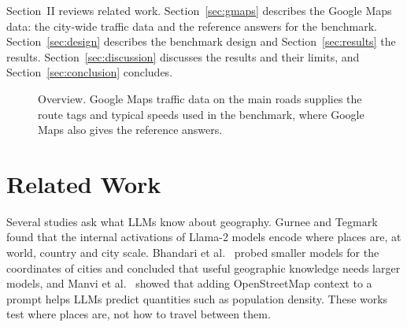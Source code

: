 \documentclass[conference]{IEEEtran}
\begin{document}
Section~II reviews related work. Section~\ref{sec:gmaps} describes the Google Maps data: the city-wide traffic data and the reference answers for the benchmark. Section~\ref{sec:design} describes the benchmark design and Section~\ref{sec:results} the results. Section~\ref{sec:discussion} discusses the results and their limits, and Section~\ref{sec:conclusion} concludes.

\begin{figure}[!htb]
\centering
{}
\caption{Overview. Google Maps traffic data on the main roads supplies the route tags and typical speeds used in the benchmark, where Google Maps also gives the reference answers.}
\label{fig:overview}
\end{figure}

\section{Related Work}

Several studies ask what LLMs know about geography. Gurnee and Tegmark~\cite{gurnee2024} found that the internal activations of Llama-2 models encode where places are, at world, country and city scale. Bhandari et al.~\cite{bhandari2023} probed smaller models for the coordinates of cities and concluded that useful geographic knowledge needs larger models, and Manvi et al.~\cite{manvi2024} showed that adding OpenStreetMap context to a prompt helps LLMs predict quantities such as population density. These works test where places are, not how to travel between them.
\end{document}
